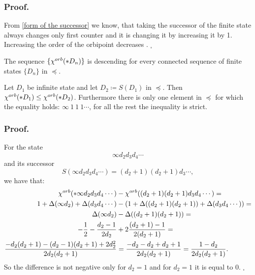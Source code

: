 \subsubsection{Proof.}
From \ref{form of the successor} we know, that taking the successor 
of the finite state always changes  
only first counter and it is changing it by increasing it by 1. 
Increasing the order of the orbipoint  
decreases \Eoc. $_\square$

\begin{corollary}\label{connected sequences corollary}
The sequence $\{{\chi^{orb}(*D_n)}\}$ is descending for every connected sequence 
of finite states $\{D_n\}$ in $\preceq$. 
\end{corollary}

\begin{lemma}
Let $D_1$ be infinite state and let $D_2 \coloneqq S(D_1)$ in $\preceq$. 
Then ${\chi^{orb}(*D_1)} \leq {\chi^{orb}(*D_2)}$. Furthermore there is only one element in $\preceq$ for 
which the equality holds: $\infty\ 1\ 1\ 1\cdots$, for all the rest the inequality is strict. 
\end{lemma}
\subsubsection{Proof.}

For the state 
\begin{equation}
\infty d_2d_3d_4\cdots\end{equation} 
and its successor 
\begin{equation}
S(\infty d_2d_3d_4\cdots) = (d_2+1)(d_2+1)d_3\cdots,
\end{equation}
 we have that: 
\begin{align}
{\chi^{orb}(*\infty d_2d_3d_4\cdots)} &- {\chi^{orb}((d_2+1)(d_2+1)d_3d_4\cdots)} = \notag \\
1 + \Delta(\infty d_2) + \Delta(d_3d_4\cdots) &- 
(1 + \Delta((d_2+1)(d_2+1)) + \Delta(d_3d_4\cdots)) = \notag \\ 
\Delta(\infty d_2) &- \Delta((d_2+1)(d_2+1)) = \notag \\
-\frac{1}{2}- \frac{d_2-1}{2d_2} &+ 2\frac{(d_2+1)-1}{2(d_2+1)} =  \\
\frac{-d_2(d_2+1) - (d_2-1)(d_2+1) + 2d_2^2}{2d_2(d_2+1)}& = 
\frac{-d_2 -d_2 + d_2 +1 }{2d_2(d_2+1)} = 
\frac{1- d_2}{2d_2(d_2 + 1)}. \notag
\end{align}
So the difference is not negative only for $d_2 = 1$ and for $d_2 = 1$ it is equal 
to $0$. $_\square$ 

